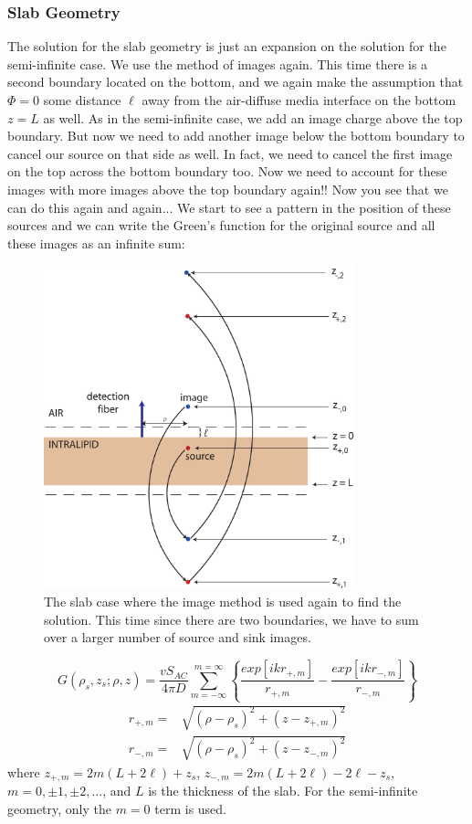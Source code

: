 \subsubsection{Slab Geometry}
The solution for the slab geometry is just an expansion on the solution for the semi-infinite case. We use the method of images again. This time there is a second boundary located on the bottom, and we again make the assumption that $\Phi=0$ some distance $\ell$ away from the air-diffuse media interface on the bottom $z=L$ as well. As in the semi-infinite case, we add an image charge above the top boundary. But now we need to add another image below the bottom boundary to cancel our source on that side as well. In fact, we need to cancel the first image on the top across the bottom boundary too.
Now we need to account for these images with more images above the top boundary again!! Now you see that we can do this again and again... We start to see a pattern in the position of these sources and we can write the Green's function for the original source and all these images as an infinite sum:
\begin{figure}[htp]
\begin{center}
\includegraphics[width=9cm]{./figures/slab3.pdf}
\caption{The slab case where the image method is used again to find  the solution. This time since there are two boundaries, we have to sum over a larger number of source and sink images.}
\label{slab}
\end{center}
\end{figure}
\begin{equation}
G(\rho_s,z_s;\rho,z) = \frac{vS_{AC}}{4\pi D} \sum_{m=-\infty}^{m=\infty} 
\left\{ \frac{exp[ikr_{+,m}]}{r_{+,m}} - \frac{exp[ikr_{-,m}]}{r_{-,m}} \right\} \nonumber
\end{equation}
\begin{eqnarray}
\label{ext_both}
r_{+,m} = & \sqrt{(\rho-\rho_s)^2+(z-z_{+,m})^2} \nonumber \\
r_{-,m} = & \sqrt{(\rho-\rho_s)^2+(z-z_{-,m})^2}
\end{eqnarray}
\noindent
where $z_{+,m}=2m(L+2\ell)+z_s$, $z_{-,m}=2m(L+2\ell)-2\ell-z_s$, $m=0,\pm 1, \pm 2, ...$, and $L$ is the thickness of the slab. For the semi-infinite geometry, only the $m=0$ term is used. 

